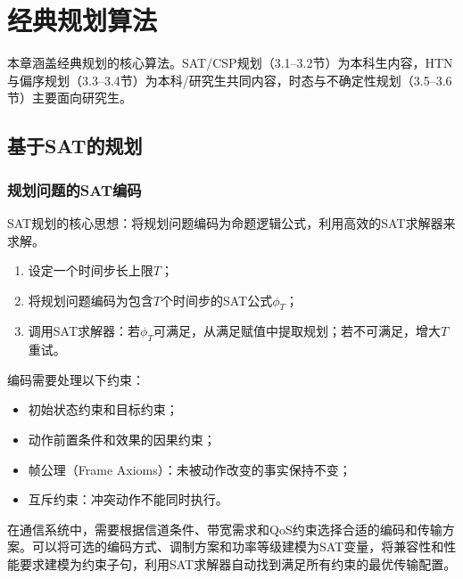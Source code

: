 \chapter{经典规划算法}

\begin{levelbox}
本章涵盖经典规划的核心算法。SAT/CSP规划（3.1--3.2节）为本科生内容，HTN与偏序规划（3.3--3.4节）为本科/研究生共同内容，时态与不确定性规划（3.5--3.6节）主要面向研究生。
\end{levelbox}

\section{基于SAT的规划 \ug}

\subsection{规划问题的SAT编码}

SAT规划的核心思想：将规划问题编码为命题逻辑公式，利用高效的SAT求解器来求解。

\begin{algbox}[title={\textbf{SAT规划基本框架}}]
\begin{enumerate}
  \item 设定一个时间步长上限$T$；
  \item 将规划问题编码为包含$T$个时间步的SAT公式$\phi_T$；
  \item 调用SAT求解器：若$\phi_T$可满足，从满足赋值中提取规划；若不可满足，增大$T$重试。
\end{enumerate}
\end{algbox}

编码需要处理以下约束：
\begin{itemize}
  \item 初始状态约束和目标约束；
  \item 动作前置条件和效果的因果约束；
  \item 帧公理（Frame Axioms）：未被动作改变的事实保持不变；
  \item 互斥约束：冲突动作不能同时执行。
\end{itemize}

\begin{appbox}[title={\textbf{应用：通信网络编码方案选择}}]
在通信系统中，需要根据信道条件、带宽需求和QoS约束选择合适的编码和传输方案。可以将可选的编码方式、调制方案和功率等级建模为SAT变量，将兼容性和性能要求建模为约束子句，利用SAT求解器自动找到满足所有约束的最优传输配置。
\end{appbox}

